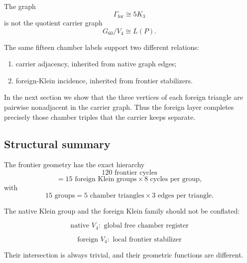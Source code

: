 The graph
\[
\Gamma_{\mathrm{for}}\cong5K_3
\]
is not the quotient carrier graph
\[
G_{60}/V_4\cong L(P).
\]

The same fifteen chamber labels support two different relations:

\begin{enumerate}
    \item carrier adjacency, inherited from native graph edges;
    \item foreign-Klein incidence, inherited from frontier stabilizers.
\end{enumerate}

In the next section we show that the three vertices of each foreign
triangle are pairwise nonadjacent in the carrier graph. Thus the
foreign layer completes precisely those chamber triples that the
carrier keeps separate.

\subsection{Structural summary}

The frontier geometry has the exact hierarchy
\[
120
\text{ frontier cycles}
\]
\[
=
15
\text{ foreign Klein groups}
\times
8
\text{ cycles per group},
\]
with
\[
15
\text{ groups}
=
5
\text{ chamber triangles}
\times
3
\text{ edges per triangle}.
\]

The native Klein group and the foreign Klein family should not be
conflated:

\[
\boxed{
\text{native }V_4:
\text{ global free chamber register}
}
\]

\[
\boxed{
\text{foreign }V_4:
\text{ local frontier stabilizer}
}
\]

Their intersection is always trivial, and their geometric functions
are different.
